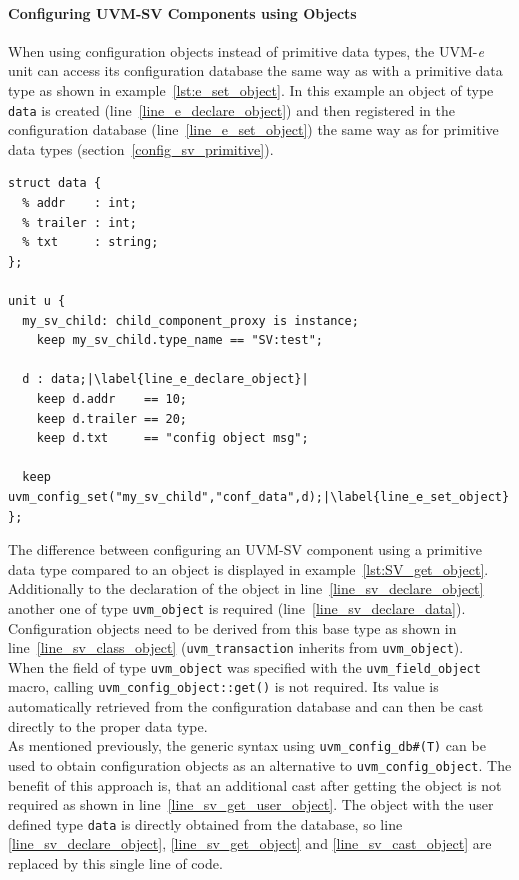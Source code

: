 \paragraph{Configuring UVM-SV Components using Objects}\label{e_config_sv_object}

When using configuration objects instead of primitive data types, the UVM-\textit{e} unit can access its configuration
database the same way as with a primitive data type as shown in example~\ref{lst:e_set_object}. In this example
an object of type \lstinline$data$ is created (line~\ref{line_e_declare_object}) and then registered in the
configuration database (line~\ref{line_e_set_object}) the same way as for primitive data types
(section~\ref{config_sv_primitive}).

\lstset{language=e, numbers = left, escapechar=|, breaklines=true}
\begin{lstlisting}[frame=htrbl, caption={e: register an object in configuration database}, label={lst:e_set_object}]
struct data {
  % addr    : int;
  % trailer : int;
  % txt     : string;
};

unit u {
  my_sv_child: child_component_proxy is instance;
    keep my_sv_child.type_name == "SV:test";
  
  d : data;|\label{line_e_declare_object}|
    keep d.addr    == 10;
    keep d.trailer == 20;
    keep d.txt     == "config object msg";

  keep uvm_config_set("my_sv_child","conf_data",d);|\label{line_e_set_object}|
};
\end{lstlisting}
The difference between configuring an UVM-SV component using a primitive data type compared to an object
is displayed in example~\ref{lst:SV_get_object}. Additionally to the declaration of the object in
line~\ref{line_sv_declare_object} another one of type \lstinline$uvm_object$ is required
(line~\ref{line_sv_declare_data}). Configuration objects need to be derived from this base type as shown in
line~\ref{line_sv_class_object} (\lstinline$uvm_transaction$ inherits from \lstinline$uvm_object$).\\
When the field of type \lstinline$uvm_object$ was specified with the \lstinline$uvm_field_object$ macro, calling
\lstinline$uvm_config_object::get()$ is not required. Its value is automatically retrieved from the configuration
database and can then be cast directly to the proper data type.\\
As mentioned previously, the generic syntax using \lstinline$uvm_config_db#(T)$ can be used to obtain configuration
objects as an alternative to \lstinline$uvm_config_object$.
The benefit of this approach is, that an additional cast after getting the object is not required as shown in
line~\ref{line_sv_get_user_object}. The object with the user defined type \lstinline$data$ is directly obtained from
the database, so line \ref{line_sv_declare_object}, \ref{line_sv_get_object} and \ref{line_sv_cast_object} are replaced
by this single line of code.

